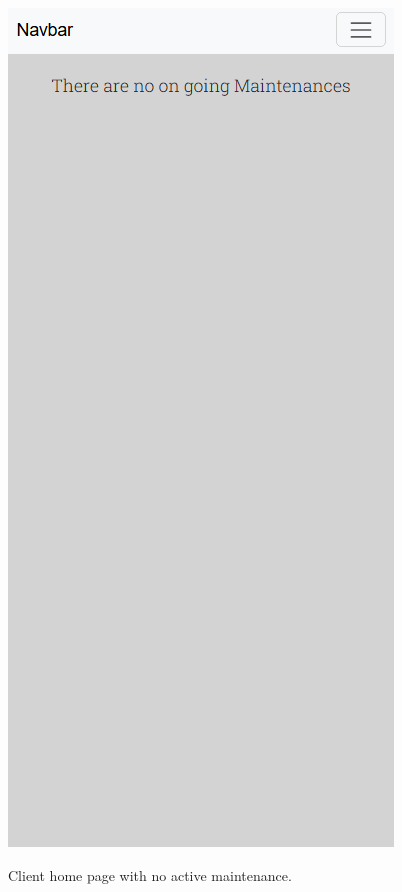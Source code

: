 \begin{figure}[htbp]
  \caption{Client home page with no active maintenance.}
  \centering
  \includegraphics[width=\textwidth]{figs/Implementation/client/MaintenanceNoState}
  \label{fig:MaintenanceNoState}
\end{figure}



